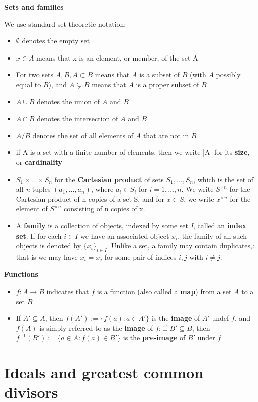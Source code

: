 \documentclass [11pt]{article}
\begin{document}
\begin{center}
  \textbf{Sets and families}
\end{center}
We use standard set-theoretic notation: \\
\begin{itemize} 
\item $\emptyset$ denotes the empty set
\item $x \in A$ means that x is an element, or member, of the set A 
\item For two sets $A, B, A \subset B $ means that $A$ is a subset of $B$ (with $A$ possibly equal to $B$), and $A \subsetneq B$ means that $A$ is a proper subset of $B$
\item $A \cup B$ denotes the union of $A$ and $B$
\item $A \cap B$ denotes the intersection of $A$ and $B$
\item $A / B$ denotes the set of all elements of $A$ that are not in $B$
\item if A is a set with a finite number of elements, then we write |A| for its \textbf{size}, or \textbf{cardinality}
\item $S_1 \times \ldots \times S_n$ for the \textbf{Cartesian product} of sets $S_1 ,\ldots,S_n$, which is the set of all \textit{n}-tuples $(a_1, \ldots, a_n)$, where $a_i \in S_i$ for $i = 1,\ldots,n$. We write $S^{\times n}$ for the Cartesian product of n copies of a set S, and for $x \in S$, we write $x^{\times n}$ for the element of $S^{\times n}$ consisting of n copies of x.
\item A \textbf{family} is a collection of objects, indexed by some set \textit{I}, called an \textbf{index set}. If for each $i \in I$ we have an associated object $x_i$, the family of all such objects is denoted by $\{x_i\}_{i \in I}$. Unlike a set, a family may contain duplicates,: that is we may have $x_i = x_j$ for some pair of indices $i,j$ with $i \neq j$. 
\end{itemize}

\begin{center}
\textbf{Functions}
\end{center}
\begin{itemize}
\item $f \colon A \rightarrow B $ indicates that $f$ is a function (also called a \textbf{map}) from a set $A$ to a set $B$
\item If $A' \subseteq A$, then $f(A') := \{ f(a) : a \in A' \}$ is the \textbf{image} of $A'$ undef $f$, and $f(A)$ is simply referred to as the \textbf{image} of $f$; if $B' \subseteq B$, then $f^{-1}(B'):= \{ a \in A: f(a) \in B' \}$ is the \textbf{pre-image} of $B'$ under $f$
\end{itemize}

\section{Ideals and greatest common divisors}
\end{document}
